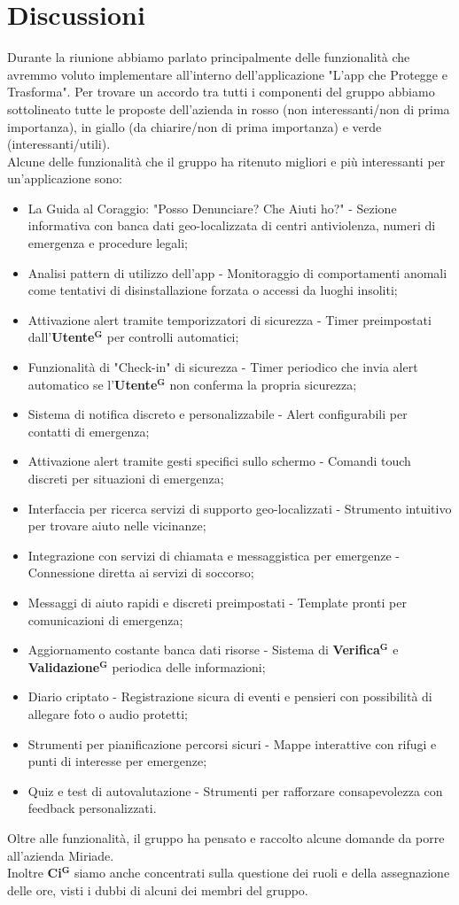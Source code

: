 \documentclass[a4paper,12pt]{article}
\newcommand{\term}[1]{\textbf{#1}$^\mathbf{G}$}
\begin{document}
\section{Discussioni}
Durante la riunione abbiamo parlato principalmente delle funzionalità che avremmo voluto implementare all'interno dell'applicazione "L'app che Protegge e Trasforma".
Per trovare un accordo tra tutti i componenti del gruppo abbiamo sottolineato tutte le proposte dell'azienda in rosso (non interessanti/non di prima importanza), in giallo (da chiarire/non di prima importanza) e verde (interessanti/utili).\\
Alcune delle funzionalità che il gruppo ha ritenuto migliori e più interessanti per un'applicazione sono:
\begin{itemize}
    \item La Guida al Coraggio: "Posso Denunciare? Che Aiuti ho?" - Sezione informativa con banca dati geo-localizzata di centri antiviolenza, numeri di emergenza e procedure legali;
    \item Analisi pattern di utilizzo dell'app - Monitoraggio di comportamenti anomali come tentativi di disinstallazione forzata o accessi da luoghi insoliti;
    \item Attivazione alert tramite temporizzatori di sicurezza - Timer preimpostati dall'\term{Utente} per controlli automatici;
    \item Funzionalità di "Check-in" di sicurezza - Timer periodico che invia alert automatico se l'\term{Utente} non conferma la propria sicurezza;
    \item Sistema di notifica discreto e personalizzabile - Alert configurabili per contatti di emergenza;
    \item Attivazione alert tramite gesti specifici sullo schermo - Comandi touch discreti per situazioni di emergenza;
    \item Interfaccia per ricerca servizi di supporto geo-localizzati - Strumento intuitivo per trovare aiuto nelle vicinanze;
    \item Integrazione con servizi di chiamata e messaggistica per emergenze - Connessione diretta ai servizi di soccorso;
    \item Messaggi di aiuto rapidi e discreti preimpostati - Template pronti per comunicazioni di emergenza;
    \item Aggiornamento costante banca dati risorse - Sistema di \term{Verifica} e \term{Validazione} periodica delle informazioni;
    \item Diario criptato - Registrazione sicura di eventi e pensieri con possibilità di allegare foto o audio protetti;
    \item Strumenti per pianificazione percorsi sicuri - Mappe interattive con rifugi e punti di interesse per emergenze;
    \item Quiz e test di autovalutazione - Strumenti per rafforzare consapevolezza con feedback personalizzati.
\end{itemize}
Oltre alle funzionalità, il gruppo ha pensato e raccolto alcune domande da porre all'azienda Miriade.\\
Inoltre \term{Ci} siamo anche concentrati sulla questione dei ruoli e della assegnazione delle ore, visti i dubbi di alcuni dei membri del gruppo.
\end{document}
